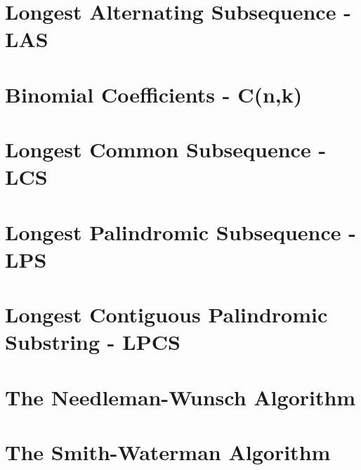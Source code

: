 \section{Longest Alternating Subsequence - LAS}


\section{Binomial Coefficients - C(n,k)}


\section{Longest Common Subsequence - LCS} \label{section:lcs}


\section{Longest Palindromic Subsequence - LPS}


\section{Longest Contiguous Palindromic Substring - LPCS}


\section{The Needleman-Wunsch Algorithm}


\section{The Smith-Waterman Algorithm}


